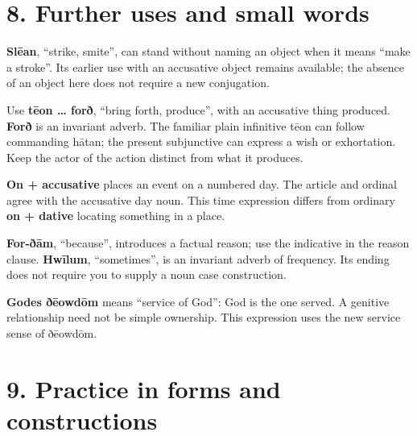 \section*{8. Further uses and small words}

\textbf{Slēan}, “strike, smite”, can stand without naming an object when it means “make a stroke”. Its earlier use with an accusative object remains available; the absence of an object here does not require a new conjugation.

Use \textbf{tēon … forð}, “bring forth, produce”, with an accusative thing produced. \textbf{Forð} is an invariant adverb. The familiar plain infinitive tēon can follow commanding hātan; the present subjunctive can express a wish or exhortation. Keep the actor of the action distinct from what it produces.

\textbf{On + accusative} places an event on a numbered day. The article and ordinal agree with the accusative day noun. This time expression differs from ordinary \textbf{on + dative} locating something in a place.

\textbf{For-ðām}, “because”, introduces a factual reason; use the indicative in the reason clause. \textbf{Hwīlum}, “sometimes”, is an invariant adverb of frequency. Its ending does not require you to supply a noun case construction.

\textbf{Godes ðēowdōm} means “service of God”: God is the one served. A genitive relationship need not be simple ownership. This expression uses the new service sense of ðēowdōm.

\section*{9. Practice in forms and constructions}

